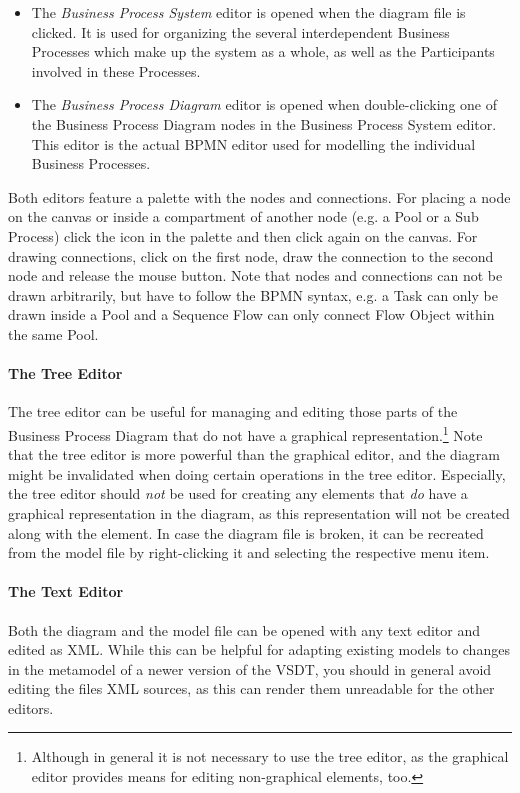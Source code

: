 \begin{itemize}
	\item The \emph{Business Process System} editor is opened when the diagram file is clicked.  It is used for organizing the several interdependent Business Processes which make up the system as a whole, as well as the Participants involved in these Processes.
	\item The \emph{Business Process Diagram} editor is opened when double-clicking one of the Business Process Diagram nodes in the Business Process System editor.  This editor is the actual BPMN editor used for modelling the individual Business Processes.
\end{itemize}

Both editors feature a palette with the nodes and connections. For placing a node on the canvas or inside a compartment of another node (e.g. a Pool or a Sub Process) click the icon in the palette and then click again on the canvas.  For drawing connections, click on the first node, draw the connection to the second node and release the mouse button. Note that nodes and connections can not be drawn arbitrarily, but have to follow the BPMN syntax, e.g. a Task can only be drawn inside a Pool and a Sequence Flow can only connect Flow Object within the same Pool.

\paragraph*{The Tree Editor}
The tree editor can be useful for managing and editing those parts of the Business Process Diagram that do not have a graphical representation.\footnote{Although in general it is not necessary to use the tree editor, as the graphical editor provides means for editing non-graphical elements, too.}  Note that the tree editor is more powerful than the graphical editor, and the diagram might be invalidated when doing certain operations in the tree editor.  Especially, the tree editor should \emph{not} be used for creating any elements that \emph{do} have a graphical representation in the diagram, as this representation will not be created along with the element.  In case the diagram file is broken, it can be recreated from the model file by right-clicking it and selecting the respective menu item.

\paragraph*{The Text Editor}
Both the diagram and the model file can be opened with any text editor and edited as XML.  While this can be helpful for adapting existing models to changes in the metamodel of a newer version of the VSDT, you should in general avoid editing the files XML sources, as this can render them unreadable for the other editors.



